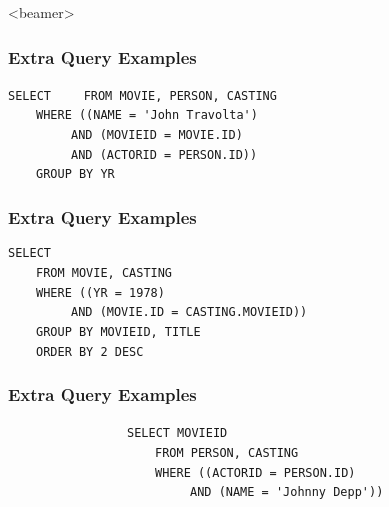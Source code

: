 \documentclass[dvipsnames]{beamer}
\theoremstyle{plain}
\begin{document}
\mode
<beamer>

\begin{frame}[fragile]
  \frametitle{Extra Query Examples}

  \begin{example}
\lstinline!SELECT! 
~~~~\lstinline!FROM MOVIE, PERSON, CASTING!\\
\pause
~~~~\lstinline!WHERE ((NAME = 'John Travolta')!\\
~~~~~~~~~\lstinline!AND (MOVIEID = MOVIE.ID)!\\
~~~~~~~~~\lstinline!AND (ACTORID = PERSON.ID))!\\
\pause
~~~~\lstinline!GROUP BY YR!
  \end{example}
\end{frame}

\begin{frame}[fragile]
  \frametitle{Extra Query Examples}

  \begin{example}
\lstinline!SELECT! \\
~~~~\lstinline!FROM MOVIE, CASTING!\\
\pause
~~~~\lstinline!WHERE ((YR = 1978)!\\
~~~~~~~~~\lstinline!AND (MOVIE.ID = CASTING.MOVIEID))!\\
\pause
~~~~\lstinline!GROUP BY MOVIEID, TITLE!\\
\pause\pause
~~~~\lstinline!ORDER BY 2 DESC!
  \end{example}
\end{frame}

\begin{frame}[fragile]
  \frametitle{Extra Query Examples}

  \begin{example}
~~~~~~~~~~~~~~~~~\lstinline!SELECT MOVIEID!\\
~~~~~~~~~~~~~~~~~~~~~\lstinline!FROM PERSON, CASTING!\\
~~~~~~~~~~~~~~~~~~~~~\lstinline!WHERE ((ACTORID = PERSON.ID)!\\
~~~~~~~~~~~~~~~~~~~~~~~~~~\lstinline!AND (NAME = 'Johnny Depp'))!\\
  \end{example}
\end{frame}
\end{document}
